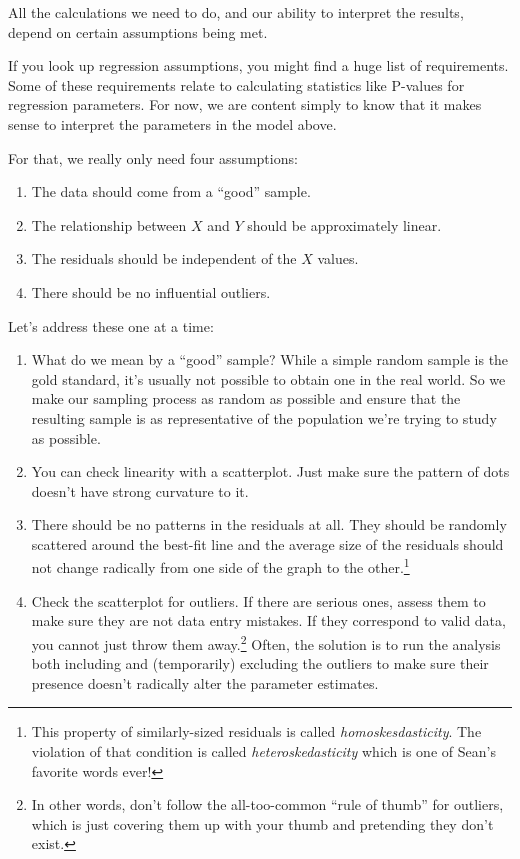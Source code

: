 \documentclass[
]{book}
\providecommand{\tightlist}{%
  \setlength{\itemsep}{0pt}\setlength{\parskip}{0pt}}
\begin{document}
All the calculations we need to do, and our ability to interpret the results, depend on certain assumptions being met.

If you look up regression assumptions, you might find a huge list of requirements. Some of these requirements relate to calculating statistics like P-values for regression parameters. For now, we are content simply to know that it makes sense to interpret the parameters in the model above.

For that, we really only need four assumptions:

\begin{enumerate}
\def\labelenumi{\arabic{enumi}.}
\tightlist
\item
  The data should come from a ``good'' sample.
\item
  The relationship between \(X\) and \(Y\) should be approximately linear.
\item
  The residuals should be independent of the \(X\) values.
\item
  There should be no influential outliers.
\end{enumerate}

Let's address these one at a time:

\begin{enumerate}
\def\labelenumi{\arabic{enumi}.}
\tightlist
\item
  What do we mean by a ``good'' sample? While a simple random sample is the gold standard, it's usually not possible to obtain one in the real world. So we make our sampling process as random as possible and ensure that the resulting sample is as representative of the population we're trying to study as possible.
\item
  You can check linearity with a scatterplot. Just make sure the pattern of dots doesn't have strong curvature to it.
\item
  There should be no patterns in the residuals at all. They should be randomly scattered around the best-fit line and the average size of the residuals should not change radically from one side of the graph to the other.\footnote{This property of similarly-sized residuals is called \emph{homoskesdasticity}. The violation of that condition is called \emph{heteroskedasticity} which is one of Sean's favorite words ever!}
\item
  Check the scatterplot for outliers. If there are serious ones, assess them to make sure they are not data entry mistakes. If they correspond to valid data, you cannot just throw them away.\footnote{In other words, don't follow the all-too-common ``rule of thumb'' for outliers, which is just covering them up with your thumb and pretending they don't exist.} Often, the solution is to run the analysis both including and (temporarily) excluding the outliers to make sure their presence doesn't radically alter the parameter estimates.
\end{enumerate}
\end{document}
